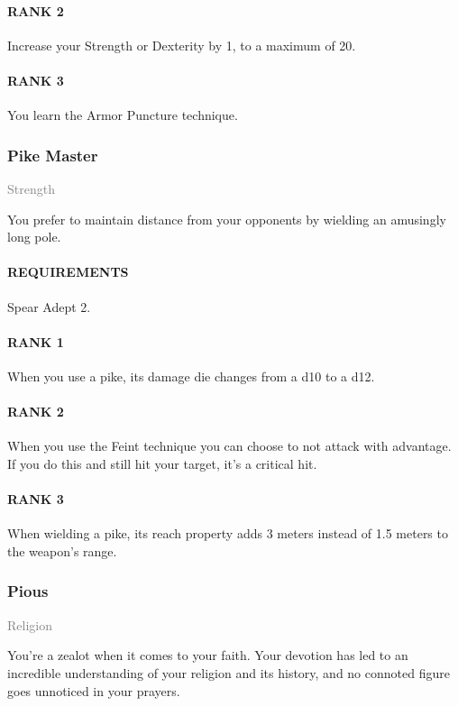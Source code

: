 \paragraph{RANK 2} Increase your Strength or Dexterity by 1, to a maximum of 20.
\paragraph{RANK 3} You learn the Armor Puncture technique.

\subsubsection{Pike Master} \label{tal::pikemaster}
\small{\textcolor{gray}{Strength}}

\normalsize
You prefer to maintain distance from your opponents by wielding an amusingly long pole.
\paragraph{REQUIREMENTS} Spear Adept 2.
\paragraph{RANK 1} When you use a pike, its damage die changes from a d10 to a d12.
\paragraph{RANK 2} When you use the Feint technique you can choose to not attack with advantage.
If you do this and still hit your target, it's a critical hit.
\paragraph{RANK 3} When wielding a pike, its reach property adds 3 meters instead of 1.5 meters to the weapon's range.

\subsubsection{Pious} \label{tal::pious}
\small{\textcolor{gray}{Religion}}

\normalsize
You're a zealot when it comes to your faith.
Your devotion has led to an incredible understanding of your religion and its history, and no connoted figure goes unnoticed in your prayers.
